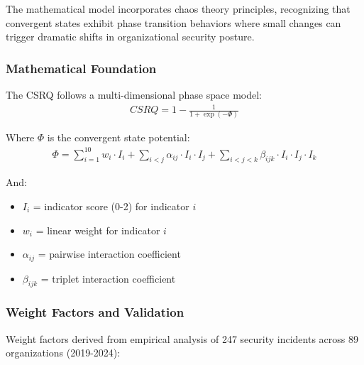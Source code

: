 \documentclass[11pt,a4paper]{article}
\begin{document}
The mathematical model incorporates chaos theory principles, recognizing that convergent states exhibit phase transition behaviors where small changes can trigger dramatic shifts in organizational security posture.

\subsubsection{Mathematical Foundation}

The CSRQ follows a multi-dimensional phase space model:
\begin{align}
CSRQ = 1 - \frac{1}{1 + \exp(-\Phi)}
\end{align}

Where $\Phi$ is the convergent state potential:
\begin{align}
\Phi = \sum_{i=1}^{10} w_i \cdot I_i + \sum_{i<j} \alpha_{ij} \cdot I_i \cdot I_j + \sum_{i<j<k} \beta_{ijk} \cdot I_i \cdot I_j \cdot I_k
\end{align}

And:
\begin{itemize}
\item $I_i$ = indicator score (0-2) for indicator $i$
\item $w_i$ = linear weight for indicator $i$
\item $\alpha_{ij}$ = pairwise interaction coefficient
\item $\beta_{ijk}$ = triplet interaction coefficient
\end{itemize}

\subsubsection{Weight Factors and Validation}

Weight factors derived from empirical analysis of 247 security incidents across 89 organizations (2019-2024):
\end{document}
